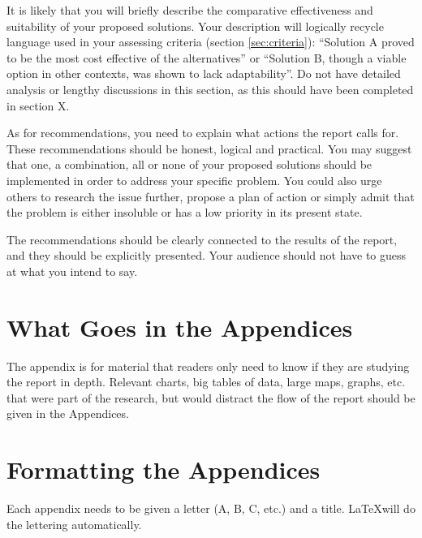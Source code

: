 \documentclass[peerreview]{IEEEtran}
\begin{document}
It is likely that you will briefly describe the comparative effectiveness and suitability of your proposed solutions. Your description will logically recycle language used in your assessing criteria (section \ref{sec:criteria}): ``Solution A proved to be the most cost effective of the alternatives'' or ``Solution B, though a viable option in other contexts, was shown to lack adaptability''.  Do not have detailed analysis or lengthy discussions in this section, as this should have been completed in section X. 
 
As for recommendations, you need to explain what actions the report calls for. These recommendations should be honest, logical and practical. You may suggest that one, a combination, all or none of your proposed solutions should be implemented in order to address your specific problem. You could also urge others to research the issue further, propose a plan of action or simply admit that the problem is either insoluble or has a low priority in its present state.   

The recommendations should be clearly connected to the results of the report, and they should be explicitly presented. Your audience should not have to guess at what you intend to say.  




\appendices
\section{What Goes in the Appendices} \label{App:WhatGoes}
The appendix is for material that readers only need to know if they are studying the report in depth. Relevant charts, big tables of data, large maps, graphs, etc. that were part of the research, but would distract the flow of the report should be given in the Appendices. 
\section{Formatting the Appendices} \label{App:Formatting}
Each appendix needs to be given a letter (A, B, C, etc.) and a title. \LaTeX will do the lettering automatically.
\end{document}
